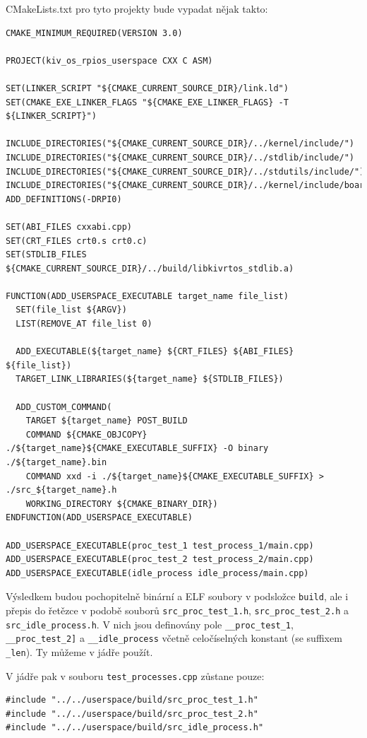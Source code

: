 \documentclass{article}
\begin{document}
CMakeLists.txt pro tyto projekty bude vypadat nějak takto:
\begin{lstlisting}
CMAKE_MINIMUM_REQUIRED(VERSION 3.0)

PROJECT(kiv_os_rpios_userspace CXX C ASM)

SET(LINKER_SCRIPT "${CMAKE_CURRENT_SOURCE_DIR}/link.ld")
SET(CMAKE_EXE_LINKER_FLAGS "${CMAKE_EXE_LINKER_FLAGS} -T ${LINKER_SCRIPT}")

INCLUDE_DIRECTORIES("${CMAKE_CURRENT_SOURCE_DIR}/../kernel/include/")
INCLUDE_DIRECTORIES("${CMAKE_CURRENT_SOURCE_DIR}/../stdlib/include/")
INCLUDE_DIRECTORIES("${CMAKE_CURRENT_SOURCE_DIR}/../stdutils/include/")
INCLUDE_DIRECTORIES("${CMAKE_CURRENT_SOURCE_DIR}/../kernel/include/board/rpi0/")
ADD_DEFINITIONS(-DRPI0)

SET(ABI_FILES cxxabi.cpp)
SET(CRT_FILES crt0.s crt0.c)
SET(STDLIB_FILES ${CMAKE_CURRENT_SOURCE_DIR}/../build/libkivrtos_stdlib.a)

FUNCTION(ADD_USERSPACE_EXECUTABLE target_name file_list)
  SET(file_list ${ARGV})
  LIST(REMOVE_AT file_list 0)

  ADD_EXECUTABLE(${target_name} ${CRT_FILES} ${ABI_FILES} ${file_list})
  TARGET_LINK_LIBRARIES(${target_name} ${STDLIB_FILES})

  ADD_CUSTOM_COMMAND(
    TARGET ${target_name} POST_BUILD
    COMMAND ${CMAKE_OBJCOPY} ./${target_name}${CMAKE_EXECUTABLE_SUFFIX} -O binary ./${target_name}.bin
    COMMAND xxd -i ./${target_name}${CMAKE_EXECUTABLE_SUFFIX} > ./src_${target_name}.h
    WORKING_DIRECTORY ${CMAKE_BINARY_DIR})
ENDFUNCTION(ADD_USERSPACE_EXECUTABLE)

ADD_USERSPACE_EXECUTABLE(proc_test_1 test_process_1/main.cpp)
ADD_USERSPACE_EXECUTABLE(proc_test_2 test_process_2/main.cpp)
ADD_USERSPACE_EXECUTABLE(idle_process idle_process/main.cpp)
\end{lstlisting}

Výsledkem budou pochopitelně binární a ELF soubory v podsložce \texttt{build}, ale i přepis do řetězce v podobě souborů \texttt{src\_proc\_test\_1.h}, \texttt{src\_proc\_test\_2.h} a \texttt{src\_idle\_process.h}. V nich jsou definovány pole \texttt{\_\_proc\_test\_1}, \texttt{\_\_proc\_test\_2]} a \texttt{\_\_idle\_process} včetně celočíselných konstant (se suffixem \texttt{\_len}). Ty můžeme v jádře použít.

V jádře pak v souboru \texttt{test\_processes.cpp} zůstane pouze:
\begin{lstlisting}
#include "../../userspace/build/src_proc_test_1.h"
#include "../../userspace/build/src_proc_test_2.h"
#include "../../userspace/build/src_idle_process.h"
\end{lstlisting}
\end{document}
